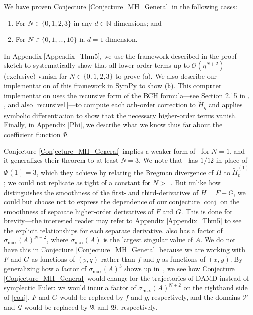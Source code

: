 \documentclass[11pt]{article}
\renewcommand{\P}{\mathcal{P}}
\newcommand{\N}{\mathbb{N}}
\newcommand{\Q}{\mathcal{Q}}
\newcommand{\frA}{\mathfrak{A}}
\newcommand{\frB}{\mathfrak{B}}
\begin{document}
We have proven Conjecture \ref{Conjecture_MH_General} in the following cases: 
\begin{enumerate}
    \item[(a)] For $N \in \{0,1,2,3\}$ in any $d\in\N$ dimensions; and
    \item[(b)] For $N \in \{0,1,\dots,10\}$ in $d=1$ dimension.
\end{enumerate}
In Appendix \ref{Appendix_Thm5}, we use the framework described in the proof sketch to systematically show that all lower-order terms up to $\mathcal{O}\left(\eta^{N+2}\right)$ (exclusive) vanish for $N \in \{0,1,2,3\}$ to prove (a). We also describe our implementation of this framework in SymPy \citep{SymPy} to show (b). This computer implementation uses the recursive form of the BCH formula---see Section 2.15 in \cite{Varadarajan1984}, \cite{Casas}, and also \eqref{recursive1}---to compute each $n$th-order correction to $\widetilde{H}_{\eta}$ and applies symbolic differentiation to show that the necessary higher-order terms vanish. Finally, in Appendix \ref{Phi}, we describe what we know thus far about the coefficient function $\Phi$.

Conjecture \ref{Conjecture_MH_General} implies a weaker form of~\cite[Theorem~4.4]{Wibisono2022} for $N=1$, and it generalizes their theorem to at least $N=3$. We note that~\cite[Theorem~4.4]{Wibisono2022} has $1/12$ in place of $\Phi\left(1\right)=3$, which they achieve by relating the Bregman divergence of $H$ to $\widetilde{H}_{\eta}^{(1)}$; we could not replicate as tight of a constant for $N>1$. 
But unlike how \cite{Wibisono2022} distinguishes the smoothness of the first- and third-derivatives of $H=F+G$, we could but choose not to express the dependence of our conjecture \eqref{conj} on the smoothness of separate higher-order derivatives of $F$ and $G$. This is done for brevity---the interested reader may refer to Appendix \ref{Appendix_Thm5} to see the explicit relationships for each separate derivative. 
\cite{Wibisono2022} also has a factor of $\sigma_{\max}\left(A\right)^{N+2}$, where $\sigma_{\max}\left(A\right)$ is the largest singular value of $A$. We do not have this in Conjecture \ref{Conjecture_MH_General} because we are working with $F$ and $G$ as functions of $(p,q)$ rather than $f$ and $g$ as functions of $(x,y)$. By generalizing how a factor of $\sigma_{\max}\left(A\right)^{3}$ shows up in~\cite[Theorem~4.4]{Wibisono2022}, we see how Conjecture \ref{Conjecture_MH_General} would change for the trajectories of DAMD instead of symplectic Euler: we would incur a factor of $\sigma_{\max}\left(A\right)^{N+2}$ on the righthand side of \eqref{conj}, $F$ and $G$ would be replaced by $f$ and $g$, respectively, and the domains $\P$ and $\Q$ would be replaced by $\frA$ and $\frB$, respectively.
\end{document}

